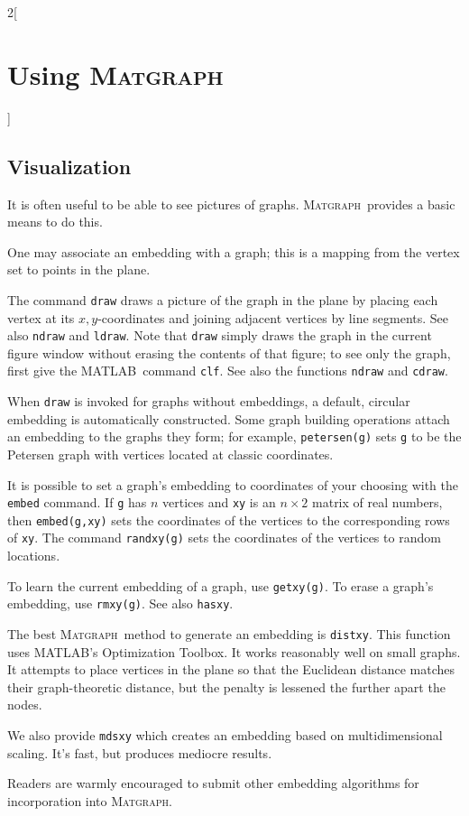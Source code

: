\documentclass{amsart}
\newcommand\matlab{MATLAB}
\newcommand\matgraph{\textsc{Matgraph}}
\begin{document}
\begin{multicols}{2}[\section{Using \matgraph}]
\subsection{Visualization}

It is often useful to be able to see pictures of graphs. \matgraph\
provides a basic means to do this. 

One may associate an embedding with a graph; this is a mapping from
the vertex set to points in the plane.

The command \verb|draw| draws a picture of the graph in the plane by
placing each vertex at its $x,y$-coordinates and joining adjacent
vertices by line segments. See also \verb|ndraw| and \verb|ldraw|.
Note that \verb|draw| simply draws the graph in the current figure
window without erasing the contents of that figure; to see only the
graph, first give the \matlab\ command \verb|clf|. See also the
functions \verb|ndraw| and \verb|cdraw|. 

When \verb|draw| is invoked for graphs without embeddings, a default,
circular embedding is automatically constructed. Some graph building
operations attach an embedding to the graphs they form; for example,
\verb|petersen(g)| sets \verb|g| to be the Petersen graph with
vertices located at classic coordinates. 

It is possible to set a graph's embedding to coordinates of your
choosing with the \verb|embed| command. If \verb|g| has $n$ vertices
and \verb|xy| is an $n\times2$ matrix of real numbers, then
\verb|embed(g,xy)| sets the coordinates of the vertices to the
corresponding rows of \verb|xy|. The command \verb|randxy(g)| sets the
coordinates of the vertices to random locations. 

To learn the current embedding of a graph, use \verb|getxy(g)|. To
erase a graph's embedding, use \verb|rmxy(g)|. See also \verb|hasxy|.

The best \matgraph\ method to generate an embedding is
\verb|distxy|. This function uses \matlab's Optimization Toolbox. It
works reasonably well on small graphs. It attempts to place vertices
in the plane so that the Euclidean distance matches their
graph-theoretic distance, but the penalty is lessened the further
apart the nodes.


We also provide \verb|mdsxy| which creates an embedding based on
multidimensional scaling. It's fast, but produces mediocre results.



Readers are warmly encouraged to submit other embedding algorithms
for incorporation into \matgraph. 

\end{multicols}
\end{document}
